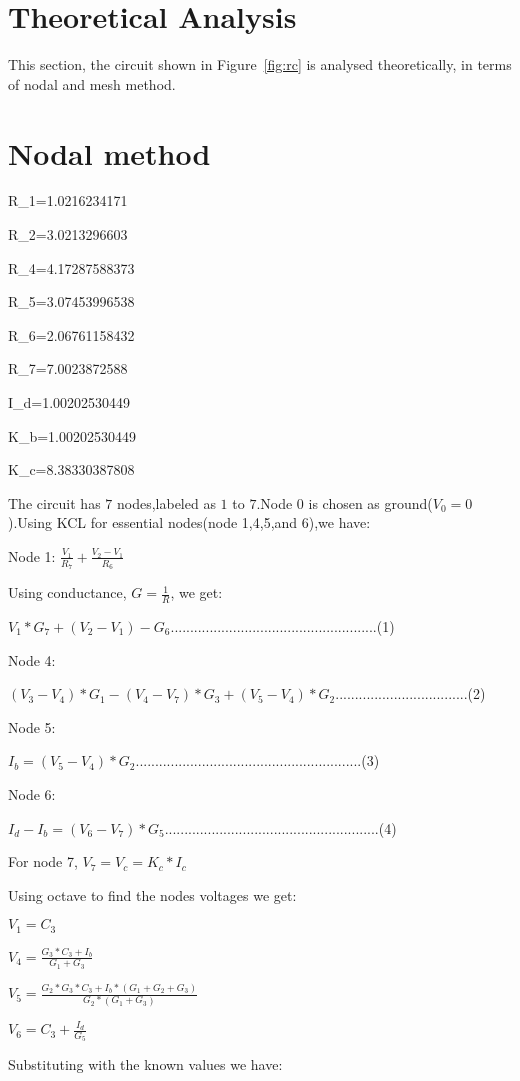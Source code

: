 \section{Theoretical Analysis}
\label{sec:analysis}
This section, the circuit shown in Figure~\ref{fig:rc} is analysed
theoretically, in terms of nodal and mesh method.

\section{Nodal method}

R\_1=1.0216234171

R\_2=3.0213296603

R\_4=4.17287588373

R\_5=3.07453996538

R\_6=2.06761158432

R\_7=7.0023872588

I\_d=1.00202530449

K\_b=1.00202530449

K\_c=8.38330387808


The circuit has $7$ nodes,labeled as $1$ to $7$.Node $0$ is chosen as ground($V_0=0$).Using KCL for essential nodes(node 1,4,5,and 6),we have:


Node 1: $\frac{V_1}{R_7}+\frac{V_2-V_1}{R_6}$

Using conductance, $G=\frac{1}{R}$, we get:

$V_1*G_7+(V_2-V_1)-G_6$.....................................................(1)

Node 4:

$(V_3-V_4)*G_1-(V_4-V_7)*G_3+(V_5-V_4)*G_2$..................................(2)

Node 5:

$I_b=(V_5-V_4)*G_2$..........................................................(3)

Node 6:

$I_d-I_b=(V_6-V_7)*G_5$.......................................................(4)

For node 7, $V_7=V_c=K_c*I_c$


Using octave to find the nodes voltages we get:

$V_1=C_3$

$V_4=\frac{G_3*C_3+I_b}{G_1+G_3}$

$V_5=\frac{G_2*G_3*C_3+I_b*(G_1+G_2+G_3)}{G_2*(G_1+G_3)}$

$V_6=C_3+\frac{I_d}{G_5}$

Substituting with the known values we have:

